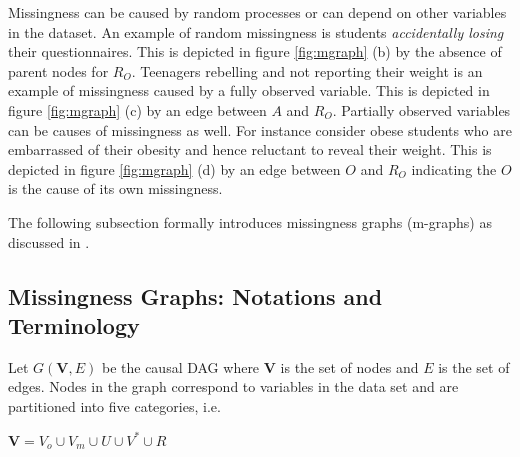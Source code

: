 \documentclass[12pt]{article}
\begin{document}
Missingness can be caused by random processes or can depend on other variables in the dataset. An example of random missingness is students \textit{accidentally losing} their questionnaires. This is depicted in figure \ref{fig:mgraph} (b) by the absence of parent nodes for $R_O$.  Teenagers rebelling and not reporting their weight is an example of missingness  caused by a fully observed variable. This is depicted in figure \ref{fig:mgraph} (c) by an edge between $A$ and $R_O$. Partially observed variables can be causes of missingness as well. For instance consider obese students who are embarrassed of their obesity and hence reluctant to reveal their weight.  This is depicted in figure \ref{fig:mgraph} (d) by an edge between $O$ and $R_O$  indicating the $O$ is the cause of its own missingness. 

The following subsection formally introduces missingness graphs (m-graphs) as discussed in \cite{mohan2013}. 
\subsection{Missingness Graphs: Notations and Terminology} \label{sec:m-graph}
Let $G (\mathbf{V},E) $ be the causal DAG where $\mathbf{V}$ is the set of nodes and $E$ is the set of edges. Nodes in the graph  correspond to variables in the data set and are partitioned into five categories, i.e.  \begin{center}
	$\mathbf{V}=V_o \cup V_m\cup U \cup V^* \cup R$
\end{center}%
\end{document}
